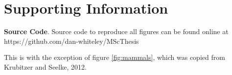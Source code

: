 \documentclass[a4paper,11pt]{article}
\begin{document}
\newpage{}


\newpage{}
\section{Supporting Information}

\textbf{Source Code}. Source code to reproduce all figures can be found online at https://github.com/dan-whiteley/MScThesis

This is with the exception of figure \ref{fig:mammals}, which was copied from Krubitzer and Seelke, 2012.
\end{document}
